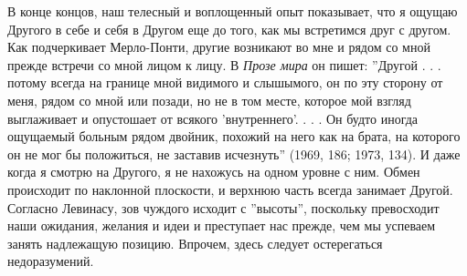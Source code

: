 \documentclass[12pt]{book}
\begin{document}
В конце концов, наш телесный и воплощенный опыт показывает, что я ощущаю Другого в себе и себя в Другом еще до того, как мы встретимся друг с другом. Как подчеркивает Мерло-Понти, другие возникают во мне и рядом со мной прежде встречи со мной лицом к лицу. В \textit{Прозе мира} он пишет: ''Другой . . . потому всегда на границе мной видимого и слышымого, он по эту сторону от меня, рядом со мной или позади, но не в том месте, которое мой взгляд выглаживает и опустошает от всякого 'внутреннего'. . . . Он будто иногда ощущаемый больным рядом двойник, похожий на него как на брата, на которого он не мог бы положиться, не заставив исчезнуть'' (1969, 186; 1973, 134). И даже когда я смотрю на Другого, я не нахожусь на одном уровне с ним. Обмен происходит по наклонной плоскости, и верхнюю часть всегда занимает Другой. Согласно Левинасу, зов чуждого исходит с ''высоты'', поскольку превосходит наши ожидания, желания и идеи и преступает нас прежде, чем мы успеваем занять надлежащую позицию. Впрочем, здесь следует остерегаться недоразумений.
\end{document}
